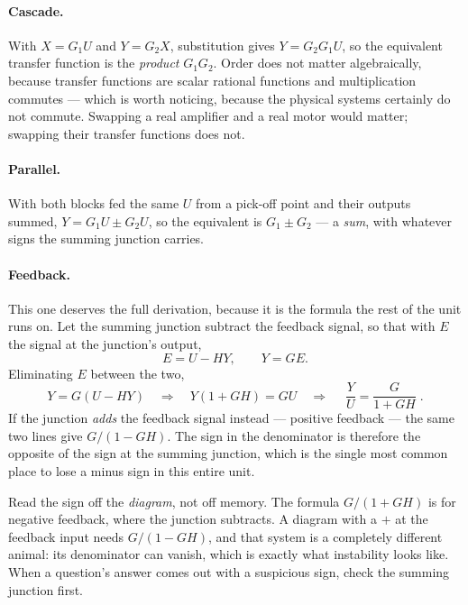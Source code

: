 \documentclass[11pt,a4paper]{article}
\begin{document}
\paragraph{Cascade.} With $X=G_1U$ and $Y=G_2X$, substitution gives
$Y=G_2G_1U$, so the equivalent transfer function is the \emph{product}
$G_1G_2$. Order does not matter algebraically, because transfer functions are
scalar rational functions and multiplication commutes --- which is worth
noticing, because the physical systems certainly do not commute. Swapping a
real amplifier and a real motor would matter; swapping their transfer functions
does not.

\paragraph{Parallel.} With both blocks fed the same $U$ from a pick-off point
and their outputs summed, $Y=G_1U\pm G_2U$, so the equivalent is
$G_1\pm G_2$ --- a \emph{sum}, with whatever signs the summing junction
carries.

\paragraph{Feedback.} This one deserves the full derivation, because it is the
formula the rest of the unit runs on. Let the summing junction subtract the
feedback signal, so that with $E$ the signal at the junction's output,
\[
  E = U - HY, \qquad Y = GE .
\]
Eliminating $E$ between the two,
\[
  Y = G\left(U - HY\right)
  \quad\Longrightarrow\quad
  Y\left(1 + GH\right) = GU
  \quad\Longrightarrow\quad
  \boxed{\;\frac{Y}{U} = \frac{G}{1+GH}\;}.
\]
If the junction \emph{adds} the feedback signal instead --- positive feedback
--- the same two lines give $G/(1-GH)$. The sign in the denominator is
therefore the opposite of the sign at the summing junction, which is the single
most common place to lose a minus sign in this entire unit.

\begin{pitfall}
Read the sign off the \emph{diagram}, not off memory. The formula
$G/(1+GH)$ is for negative feedback, where the junction subtracts. A diagram
with a $+$ at the feedback input needs $G/(1-GH)$, and that system is a
completely different animal: its denominator can vanish, which is exactly what
instability looks like. When a question's answer comes out with a suspicious
sign, check the summing junction first.
\end{pitfall}

\end{document}
